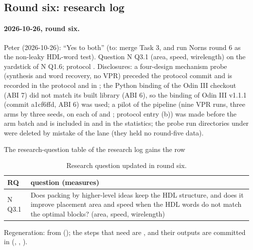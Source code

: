 
\subsection{Round six: research log}
\label{sec:r6-appendix}
\paragraph{2026-10-26, round six.} Peter (2026-10-26): ``Yes to both'' (to: merge Task 3, and run Norns round 6 as the non-leaky HDL-word test). Question N Q3.1 (area, speed, wirelength) on the yardstick of N Q1.6; protocol . Disclosures: a four-design mechanism probe (synthesis and word recovery, no VPR) preceded the protocol commit and is recorded in the protocol and in ; the Python binding of the Odin III checkout (ABI 7) did not match its built library (ABI 6), so the binding of Odin III v1.1.1 (commit a1cf6ffd, ABI 6) was used; a pilot of the pipeline (nine VPR runs, three arms by three seeds, on each of  and ; protocol entry (b)) was made before the arm batch and is included in  and in the statistics; the probe run directories under  were deleted by mistake of the lane (they held no round-five data).

The research-question table of the research log gains the row

\begin{table}[t]
\caption{Research question updated in round six.}
\label{tab:r6rq}
\centering\scriptsize
\begin{tabular}{@{}lp{6.4cm}@{}}
\toprule
RQ & question (measures) \\
\midrule
N Q3.1 & Does packing by higher-level ideas keep the HDL structure, and does it improve placement area and speed when the HDL words do not match the optimal blocks? (area, speed, wirelength) \\
\bottomrule
\end{tabular}
\end{table}
Regeneration:  from  (); the steps that need  are , and their outputs are committed in  (, , ).
